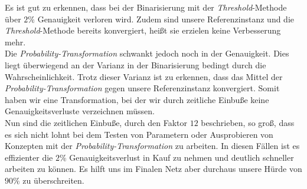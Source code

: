 Es ist gut zu erkennen, dass bei der Binarisierung mit der \textit{Threshold}-Methode über $2\%$ Genauigkeit verloren wird. Zudem sind unsere Referenzinstanz und die \textit{Threshold}-Methode bereits konvergiert, heißt sie erzielen keine Verbesserung mehr.\\
 Die \textit{Probability-Transformation} schwankt jedoch noch in der Genauigkeit. Dies liegt überwiegend an der Varianz in der Binarisierung bedingt durch die Wahrscheinlichkeit. Trotz dieser Varianz ist zu erkennen, dass das Mittel der \textit{Probability-Transformation} gegen unsere Referenzinstanz konvergiert. Somit haben wir eine Transformation, bei der wir durch zeitliche Einbuße keine Genauigkeitsverluste verzeichnen müssen.\\
 
Nun sind die zeitlichen Einbuße, durch den Faktor $12$ beschrieben, so groß, dass es sich nicht lohnt bei dem Testen von Parametern oder Ausprobieren von Konzepten mit der \textit{Probability-Transformation} zu arbeiten. In diesen Fällen ist es effizienter die $2\%$ Genauigkeitsverlust in Kauf zu nehmen und deutlich schneller arbeiten zu können. Es hilft uns im Finalen Netz aber durchaus unsere Hürde von $90\%$ zu überschreiten.


